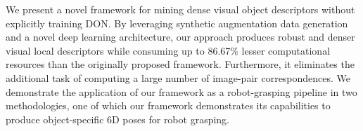 We present a novel framework for mining dense visual object descriptors without explicitly training DON.
By leveraging synthetic augmentation data generation and a novel deep learning architecture,
our approach produces robust and denser visual local descriptors while consuming up to 86.67\% lesser computational resources than the originally proposed framework.
Furthermore, it eliminates the additional task of computing a large number of image-pair correspondences.
We demonstrate the application of our framework as a robot-grasping pipeline in two methodologies,
one of which our framework demonstrates its capabilities to produce object-specific 6D poses for robot grasping.
